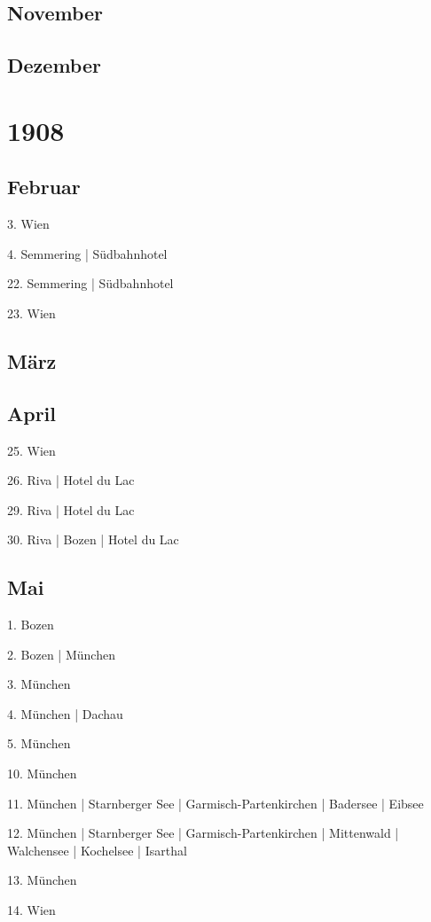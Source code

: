 \documentclass[twoside=false,titlepage=false,open=any, parskip=never, fontsize=10pt, headings=small, chapterprefix=false, appendixprefix=false, DIV=15]{scrbook}
\begin{document}
\begin{multicols}{3}
            \section*{November}
            \section*{Dezember}
            \chapter*{1908}
            \section*{Februar}
            3. Wien\par
            4. Semmering | Südbahnhotel\par
            22. Semmering | Südbahnhotel\par
            23. Wien\par
            \section*{März}
            \section*{April}
            25. Wien\par
            26. Riva | Hotel du Lac\par
            29. Riva | Hotel du Lac\par
            30. Riva | Bozen | Hotel du Lac\par
            \section*{Mai}
            1. Bozen\par
            2. Bozen | München\par
            3. München\par
            4. München | Dachau\par
            5. München\par
            10. München\par
            11. München | Starnberger See | Garmisch-Partenkirchen | Badersee | Eibsee\par
            12. München | Starnberger See | Garmisch-Partenkirchen | Mittenwald | Walchensee | Kochelsee | Isarthal\par
            13. München\par
            14. Wien\par

\end{multicols}
\end{document}
